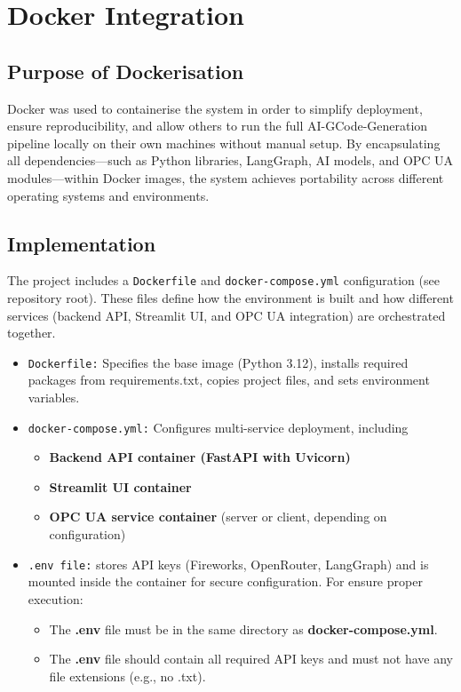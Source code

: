 \section{Docker Integration}
\subsection{Purpose of Dockerisation}
Docker was used to containerise the system in order to simplify deployment, ensure reproducibility, and allow others to run the full AI-GCode-Generation pipeline locally on their own machines without manual setup. By encapsulating all dependencies—such as Python libraries, LangGraph, AI models, and OPC UA modules—within Docker images, the system achieves portability across different operating systems and environments.

\subsection{Implementation}
The project includes a \texttt{Dockerfile} and \texttt{docker-compose.yml} configuration (see repository root). These files define how the environment is built and how different services (backend API, Streamlit UI, and OPC UA integration) are orchestrated together.


\begin{itemize}
	\item \texttt{Dockerfile:} Specifies the base image (Python 3.12), installs required packages from requirements.txt, copies project files, and sets environment variables.
	\item \texttt{docker-compose.yml:} Configures multi-service deployment, including
	\begin{itemize}
		\item \textbf{Backend API container (FastAPI with Uvicorn)}
		\item \textbf{Streamlit UI container}
		\item \textbf{OPC UA service container} (server or client, depending on configuration)
	\end{itemize}
	\item \texttt{.env file:} stores API keys (Fireworks, OpenRouter, LangGraph) and is mounted inside the container for secure configuration. For ensure proper execution:
	\begin{itemize}
		\item The \textbf{.env} file must be in the same directory as  \textbf{docker-compose.yml}.
		\item The \textbf{.env} file should contain all required API keys and must not have any file extensions (e.g., no .txt).
	\end{itemize}
\end{itemize}

